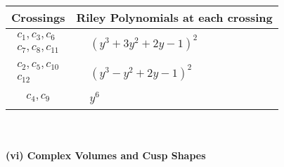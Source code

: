 \documentclass[1p]{elsarticle_modified}
\theoremstyle{definition}
\begin{document}
\begin{tabular}{m{50pt}|m{274pt}}
Crossings & \hspace{64pt}Riley Polynomials at each crossing \\
\hline $$\begin{aligned}c_{1},c_{3},c_{6}\\c_{7},c_{8},c_{11}\end{aligned}$$&$\begin{aligned}
&(y^3+3 y^2+2 y-1)^2
\end{aligned}$\\
\hline $$\begin{aligned}c_{2},c_{5},c_{10}\\c_{12}\end{aligned}$$&$\begin{aligned}
&(y^3- y^2+2 y-1)^2
\end{aligned}$\\
\hline $$\begin{aligned}c_{4},c_{9}\end{aligned}$$&$\begin{aligned}
&y^6
\end{aligned}$\\
\hline
\end{tabular}\\~\\
\newpage\flushleft \textbf{(vi) Complex Volumes and Cusp Shapes}
\end{document}
